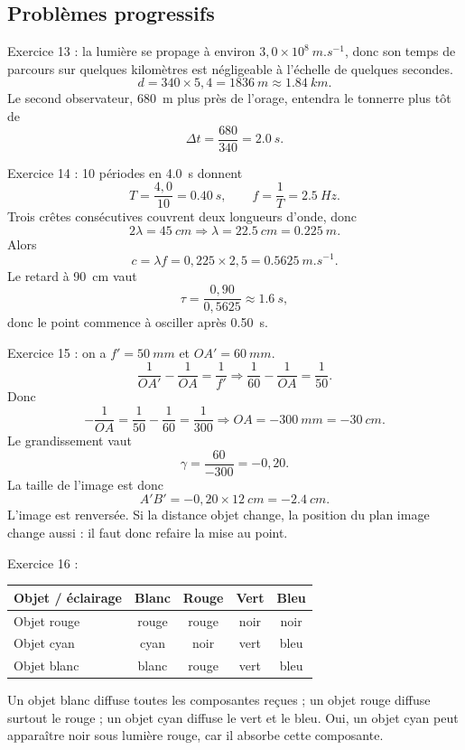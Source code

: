 \documentclass[11pt,a4paper]{article}
\begin{document}
\subsection*{Problèmes progressifs}
\begin{corrbox}
Exercice 13 : la lumière se propage à environ $3{,}0\times10^8\ \si{m.s^{-1}}$, donc son temps de parcours sur quelques kilomètres est négligeable à l'échelle de quelques secondes.
\[
d=340\times 5{,}4=\SI{1836}{m}\approx \SI{1,84}{km}.
\]
Le second observateur, \SI{680}{m} plus près de l'orage, entendra le tonnerre plus tôt de
\[
\Delta t = \frac{680}{340}=\SI{2,0}{s}.
\]
\end{corrbox}

\begin{corrbox}
Exercice 14 : 10 périodes en \SI{4,0}{s} donnent
\[
T=\frac{4{,}0}{10}=\SI{0,40}{s},\qquad f=\frac{1}{T}=\SI{2,5}{Hz}.
\]
Trois crêtes consécutives couvrent deux longueurs d'onde, donc
\[
2\lambda = \SI{45}{cm}\Rightarrow \lambda=\SI{22,5}{cm}=\SI{0,225}{m}.
\]
Alors
\[
c=\lambda f = 0{,}225\times 2{,}5 = \SI{0,5625}{m.s^{-1}}.
\]
Le retard à \SI{90}{cm} vaut
\[
\tau = \frac{0{,}90}{0{,}5625} \approx \SI{1,6}{s},
\]
donc le point commence à osciller après \SI{0,50}{s}.
\end{corrbox}

\begin{corrbox}
Exercice 15 : on a $f'=\SI{50}{mm}$ et $OA'=\SI{60}{mm}$.
\[
\frac{1}{OA'}-\frac{1}{OA}=\frac{1}{f'}
\Rightarrow \frac{1}{60}-\frac{1}{OA}=\frac{1}{50}.
\]
Donc
\[
-\frac{1}{OA}=\frac{1}{50}-\frac{1}{60}=\frac{1}{300}
\Rightarrow OA=-\SI{300}{mm}=-\SI{30}{cm}.
\]
Le grandissement vaut
\[
\gamma=\frac{60}{-300}=-0{,}20.
\]
La taille de l'image est donc
\[
A'B'=-0{,}20\times \SI{12}{cm}=-\SI{2,4}{cm}.
\]
L'image est renversée. Si la distance objet change, la position du plan image change aussi : il faut donc refaire la mise au point.
\end{corrbox}

\begin{corrbox}
Exercice 16 :
\begin{center}
\begin{tabular}{lcccc}
\toprule
Objet / éclairage & Blanc & Rouge & Vert & Bleu\\
\midrule
Objet rouge & rouge & rouge & noir & noir\\
Objet cyan & cyan & noir & vert & bleu\\
Objet blanc & blanc & rouge & vert & bleu\\
\bottomrule
\end{tabular}
\end{center}
Un objet blanc diffuse toutes les composantes reçues ; un objet rouge diffuse surtout le rouge ; un objet cyan diffuse le vert et le bleu. Oui, un objet cyan peut apparaître noir sous lumière rouge, car il absorbe cette composante.
\end{corrbox}
\end{document}

